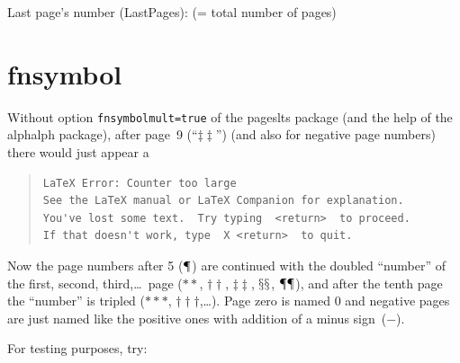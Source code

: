 \documentclass[british]{article}[2024/06/29]%
\begin{document}
Last page's number (LastPages): 
(= total number of pages)

\newpage
{}
\section{fnsymbol}

Without option \texttt{fnsymbolmult=true} of the \textsf{pageslts} package
(and the help of the \textsf{alphalph} package),
after page~9 (\textquotedblleft \ensuremath {\ddagger \ddagger }\textquotedblright )
(and also for negative page numbers) there would just appear a
\begin{quote}
\begin{verbatim}
LaTeX Error: Counter too large
See the LaTeX manual or LaTeX Companion for explanation.
You've lost some text.  Try typing  <return>  to proceed.
If that doesn't work, type  X <return>  to quit.
\end{verbatim}
\end{quote}
Now the page numbers after 5 (\ensuremath {\mathparagraph }) are
continued  with the doubled \textquotedblleft number\textquotedblright{} of
the first, second, third,\ldots\ page (\ensuremath {**},
\ensuremath {\dagger \dagger }, \ensuremath {\ddagger \ddagger },
\ensuremath {\mathsection \mathsection },
\ensuremath {\mathparagraph \mathparagraph }),
and after the tenth page the \textquotedblleft number\textquotedblright{} is
tripled (\ensuremath {***}, \ensuremath {\dagger \dagger \dagger },\ldots).
Page zero is named 0 and negative pages are just named like the positive ones
with addition of a minus \mbox{sign ($-$).}

\bigskip

For testing purposes, try:
\end{document}
